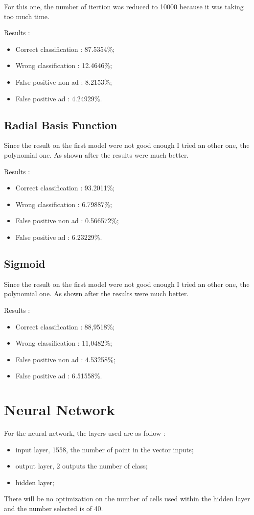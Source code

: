 For this one, the number of itertion was reduced to 10000 because it was taking too much time.

Results :
\begin{itemize}
  \item Correct classification : 87.5354\%;
  \item Wrong classification : 12.4646\%;
  \item False positive non ad : 8.2153\%;
  \item False positive ad : 4.24929\%.
\end{itemize}

\subsection{Radial Basis Function}

Since the result on the first model were not good enough I tried an other one, the polynomial one. As shown after the results were much better.

Results :
\begin{itemize}
  \item Correct classification : 93.2011\%;
  \item Wrong classification : 6.79887\%;
  \item False positive non ad : 0.566572\%;
  \item False positive ad : 6.23229\%.
\end{itemize}

\subsection{Sigmoid}

Since the result on the first model were not good enough I tried an other one, the polynomial one. As shown after the results were much better.

Results :
\begin{itemize}
  \item Correct classification : 88,9518\%;
  \item Wrong classification : 11,0482\%;
  \item False positive non ad : 4.53258\%;
  \item False positive ad : 6.51558\%.
\end{itemize}

\section{Neural Network}
For the neural network, the layers used are as follow :
  \begin{itemize}
    \item input layer, 1558, the number of point in the vector inputs;
    \item output layer, 2 outputs the number of class;
    \item hidden layer;
  \end{itemize}
  There will be no optimization on the number of cells used within the hidden layer and the number selected is of 40.

